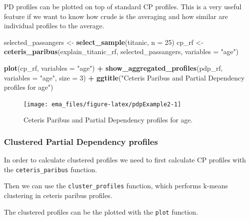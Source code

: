 \documentclass[12pt,]{krantz}
\newenvironment{Shaded}{\begin{snugshade}}{\end{snugshade}}
\newcommand{\DataTypeTok}[1]{\textcolor[rgb]{0.13,0.29,0.53}{#1}}
\newcommand{\DecValTok}[1]{\textcolor[rgb]{0.00,0.00,0.81}{#1}}
\newcommand{\KeywordTok}[1]{\textcolor[rgb]{0.13,0.29,0.53}{\textbf{#1}}}
\newcommand{\NormalTok}[1]{#1}
\newcommand{\OperatorTok}[1]{\textcolor[rgb]{0.81,0.36,0.00}{\textbf{#1}}}
\newcommand{\StringTok}[1]{\textcolor[rgb]{0.31,0.60,0.02}{#1}}
\begin{document}
PD profiles can be plotted on top of standard CP profiles. This is a very useful feature if we want to know how crude is the averaging and how similar are individual profiles to the average.

\begin{Shaded}
\begin{Highlighting}[]
\NormalTok{selected_passangers <-}\StringTok{ }\KeywordTok{select_sample}\NormalTok{(titanic, }\DataTypeTok{n =} \DecValTok{25}\NormalTok{)}
\NormalTok{cp_rf <-}\StringTok{ }\KeywordTok{ceteris_paribus}\NormalTok{(explain_titanic_rf, selected_passangers, }\DataTypeTok{variables =} \StringTok{"age"}\NormalTok{)}

\KeywordTok{plot}\NormalTok{(cp_rf, }\DataTypeTok{variables =} \StringTok{"age"}\NormalTok{) }\OperatorTok{+}
\StringTok{  }\KeywordTok{show_aggregated_profiles}\NormalTok{(pdp_rf, }\DataTypeTok{variables =} \StringTok{"age"}\NormalTok{, }\DataTypeTok{size =} \DecValTok{3}\NormalTok{) }\OperatorTok{+}
\StringTok{  }\KeywordTok{ggtitle}\NormalTok{(}\StringTok{"Ceteris Paribus and Partial Dependency profiles for age"}\NormalTok{) }
\end{Highlighting}
\end{Shaded}

\begin{figure}

{\centering \texttt{[image: ema\_files/figure-latex/pdpExample2-1]} 

}

\caption{Ceteris Paribus and Partial Dependency profiles for age.}\label{fig:pdpExample2}
\end{figure}

\hypertarget{clustered-partial-dependency-profiles-2}{%
\subsubsection{Clustered Partial Dependency profiles}\label{clustered-partial-dependency-profiles-2}}

In order to calculate clustered profiles we need to first calculate CP profiles with the \texttt{ceteris\_paribus} function.

Then we can use the \texttt{cluster\_profiles} function, which performs k-means clustering in ceteris paribus profiles.

The clustered profiles can be the plotted with the \texttt{plot} function.
\end{document}
